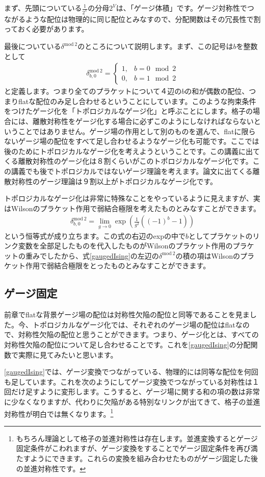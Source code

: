\documentclass[report,paper=a4, fontsize=12pt, line_length=16cm, number_of_lines=33,dvipdfmx]{jlreq}
\numberwithin{equation}{chapter}
\newcommand{\deltamod}[1]{\delta^{\mathrm{mod} \ 2}_{#1}}
\begin{document}
まず、先頭についている$\frac{1}{2^V}$の分母$2^V$は、「ゲージ体積」です。ゲージ対称性でつながるような配位は物理的に同じ配位とみなすので、分配関数はその冗長性で割っておく必要があります。

最後についている$\deltamod{}$のところについて説明します。まず、この記号は$b$を整数として
\begin{align}
  \deltamod{b,0}=
  \begin{cases}
    1, & b=0\mod{2}\\
    0, & b=1\mod{2}
  \end{cases}
  \label{deltamod2}
\end{align}
と定義します。つまり全てのプラケットについて４辺の$b$の和が偶数の配位、つまりflatな配位のみ足し合わせるということにしています。このような拘束条件をつけたゲージ化を「トポロジカルなゲージ化」と呼ぶことにします。格子の場合には、離散対称性をゲージ化する場合に必ずこのようにしなければならないということではありません。ゲージ場の作用として別のものを選んで、flatに限らないゲージ場の配位をすべて足し合わせるようなゲージ化も可能です。ここでは後のためにトポロジカルなゲージ化を考えようということです。この講義に出てくる離散対称性のゲージ化は８割くらいがこのトポロジカルなゲージ化です。この講義でも後でトポロジカルではないゲージ理論を考えます。論文に出てくる離散対称性のゲージ理論は９割以上がトポロジカルなゲージ化です。

トポロジカルなゲージ化は非常に特殊なことをやっているように見えますが、実はWilsonのプラケット作用で弱結合極限を考えたものとみなすことができます。
\begin{align}
  \deltamod{b,0}=\lim_{g\to 0} \exp(\frac{1}{g^2}((-1)^{b}-1))
\end{align}
という恒等式が成り立ちます。この式の右辺のexpの中で$b$としてプラケットのリンク変数を全部足したものを代入したものがWilsonのプラケット作用のプラケットの重みでしたから、式\eqref{gaugedIsing}の左辺の$\deltamod{}$の積の項はWilsonのプラケット作用で弱結合極限をとったものとみなすことができます。

\subsection{ゲージ固定}
前章でflatな背景ゲージ場の配位は対称性欠陥の配位と同等であることを見ました。今、トポロジカルなゲージ化では、それぞれのゲージ場の配位はflatなので、対称性欠陥の配位と思うことができます。つまり、ゲージ化とは、すべての対称性欠陥の配位について足し合わせることです。これを\eqref{gaugedIsing}の分配関数で実際に見てみたいと思います。

\eqref{gaugedIsing}では、ゲージ変換でつながっている、物理的には同等な配位を何回も足しています。これを次のようにしてゲージ変換でつながっている対称性は１回だけ足すように変形します。こうすると、ゲージ場に関する和の項の数は非常に少なくなりますが、代わりに欠陥がある特別なリンクが出てきて、格子の並進対称性が明白では無くなります。\footnote{もちろん理論として格子の並進対称性は存在します。並進変換するとゲージ固定条件がこわれますが、ゲージ変換をすることでゲージ固定条件を再び満たすようにできます。これらの変換を組み合わせたものがゲージ固定した後の並進対称性です。}
\end{document}
